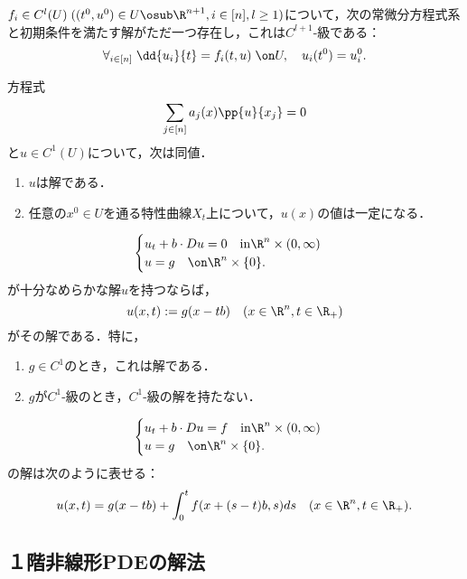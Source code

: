 \documentclass[uplatex,dvipdfmx]{jsreport}
\begin{document}
\begin{theorem}[Cauchy]
    $f_i\in C^l(U)\;((t^0,u^0)\in U\osub\R^{n+1},i\in[n],l\ge1)$について，次の常微分方程式系と初期条件を満たす解がただ一つ存在し，これは$C^{l+1}$-級である：
    \[\forall_{i\in[n]}\;\dd{u_i}{t}=f_i(t,u)\;\on U,\quad u_i(t^0)=u_i^0.\]
\end{theorem}

\begin{theorem}[線型1階PDE]
    方程式
    \[\sum_{j\in[n]}a_j(x)\pp{u}{x_j}=0\]
    と$u\in  C^1(U)$について，次は同値．
    \begin{enumerate}
        \item $u$は解である．
        \item 任意の$x^0\in U$を通る特性曲線$X_t$上について，$u(x)$の値は一定になる．
    \end{enumerate}
\end{theorem}

\begin{theorem}[斉次な輸送方程式の初期値問題]
    \[\begin{cases}
        u_t+b\cdot Du=0\quad\mathrm{in}\R^n\times(0,\infty)\\
        u=g\quad\on\R^n\times\{0\}.
    \end{cases}\]
    が十分なめらかな解$u$を持つならば，
    \[u(x,t):=g(x-tb)\quad(x\in\R^n,t\in\R_+)\]
    がその解である．特に，
    \begin{enumerate}
        \item $g\in C^1$のとき，これは解である．
        \item $g$が$C^1$-級のとき，$C^1$-級の解を持たない．
    \end{enumerate}
\end{theorem}

\begin{theorem}[非斉次な輸送方程式の初期値問題]
    \[\begin{cases}
        u_t+b\cdot Du=f\quad\mathrm{in}\R^n\times(0,\infty)\\
        u=g\quad\on\R^n\times\{0\}.
    \end{cases}\]
    の解は次のように表せる：
    \[u(x,t)=g(x-tb)+\int^t_0f(x+(s-t)b,s)ds\quad(x\in\R^n,t\in\R_+).\]
\end{theorem}

\subsection{１階非線形PDEの解法}
\end{document}
